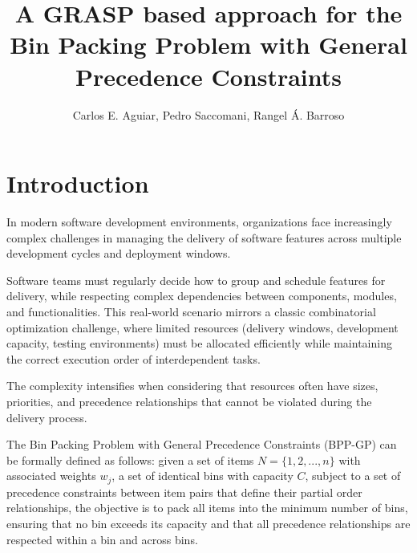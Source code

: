 \documentclass[12pt]{article}
\title{A GRASP based approach for the Bin Packing Problem with General Precedence Constraints}
\author{Carlos E. Aguiar\inst{1}, Pedro Saccomani\inst{1}, Rangel Á. Barroso\inst{1} }
\begin{document}
 

\maketitle

     


\section{Introduction}
In modern software development environments, organizations face increasingly complex challenges in managing the delivery of software features across multiple development cycles and deployment windows.

Software teams must regularly decide how to group and schedule features for delivery, while respecting complex dependencies between components, modules, and functionalities. This real-world scenario mirrors a classic combinatorial optimization challenge, where limited resources (delivery windows, development capacity, testing environments) must be allocated efficiently while maintaining the correct execution order of interdependent tasks.

The complexity intensifies when considering that resources often have sizes, priorities, and precedence relationships that cannot be violated during the delivery process.

The Bin Packing Problem with General Precedence Constraints (BPP-GP) can be formally defined as follows: given a set of items $N = \{1,2,...,n\}$ with associated weights $w_j$, a set of identical bins with capacity $C$, subject to a set of precedence constraints between item pairs that define their partial order relationships, the objective is to pack all items into the minimum number of bins, ensuring that no bin exceeds its capacity and that all precedence relationships are respected within a bin and across bins.
\end{document}
